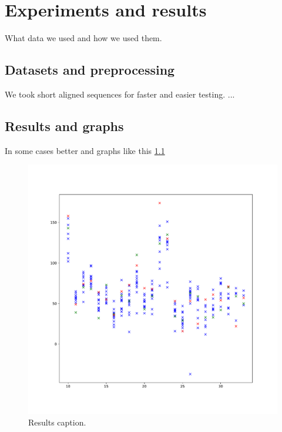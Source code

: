 \chapter{Experiments and results}

\label{kap:experiments} %

What data we used and how we used them.

\section{Datasets and preprocessing}

We took short aligned sequences for faster and easier testing. ...

\section{Results and graphs}

In some cases better and graphs like this \ref{fig:final}

\begin{figure}[h]
  \centering
  \includegraphics[width=1.0\textwidth]{images/final}
  \caption{Results caption.}
  \label{fig:final}
\end{figure}